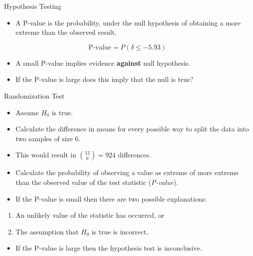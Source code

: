 \documentclass[10pt,ignorenonframetext,]{beamer}
\providecommand{\tightlist}{%
\setlength{\itemsep}{0pt}\setlength{\parskip}{0pt}}
\begin{document}
\begin{frame}{Hypothesis Testing}

\begin{itemize}
\tightlist
\item
  A P-value is the probability, under the null hypothesis of obtaining a
  more extreme than the observed result.
\end{itemize}

\[ \text{P-value}=P\left(\delta \le -5.93 \right)\]

\begin{itemize}
\item
  A small P-value implies evidence \textbf{against} null hypothesis.
\item
  If the P-value is large does this imply that the null is true?
\end{itemize}

\end{frame}

\begin{frame}{Randomization Test}

\begin{itemize}
\item
  Assume \(H_0\) is true.
\item
  Calculate the difference in means for every possible way to split the
  data into two samples of size 6.
\item
  This would result in \({{12}\choose{6}}=924\) differences.
\item
  Calculate the probability of observing a value as extreme of more
  extreme than the observed value of the test statistic
  (\emph{P-value}).
\item
  If the P-value is small then there are two possible explanations:
\end{itemize}

\begin{enumerate}
\def\labelenumi{\arabic{enumi}.}
\item
  An unlikely value of the statistic has occurred, or
\item
  The assumption that \(H_0\) is true is incorrect.
\end{enumerate}

\begin{itemize}
\tightlist
\item
  If the P-value is large then the hypothesis test is inconclusive.
\end{itemize}

\end{frame}
\end{document}
